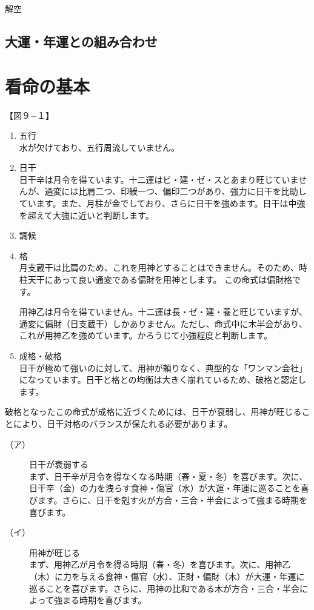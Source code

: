 \documentclass[a5paper,11pt,dvipdfmx]{tarticle}
\begin{document}
解空


\subsection{大運・年運との組み合わせ}



\clearpage




\section{看命の基本}

【図９−１】

\begin{enumerate}
\item 五行\\
水が欠けており、五行周流していません。
\item 日干\\
  日干辛は月令を得ています。十二運はビ・建・ゼ・スとあまり旺じていませんが、通変には比肩二つ、印綬一つ、偏印二つがあり、強力に日干を比助しています。また、月柱が金でしており、さらに日干を強めます。日干は中強を超えて大強に近いと判断します。
  
\item 調候\\

\item 格\\
月支蔵干は比肩のため、これを用神とすることはできません。そのため、時柱天干にあって良い通変である偏財を用神とします。
この命式は偏財格です。

用神乙は月令を得ていません。十二運は長・ゼ・建・養と旺じていますが、通変に偏財（日支蔵干）しかありません。ただし、命式中に木半会があり、これが用神乙を強めています。かろうじて小強程度と判断します。
\item 成格・破格\\
日干が極めて強いのに対して、用神が頼りなく、典型的な「ワンマン会社」になっています。日干と格との均衡は大きく崩れているため、破格と認定します。\\
\end{enumerate}


破格となったこの命式が成格に近づくためには、日干が衰弱し、用神が旺じることにより、日干対格のバランスが保たれる必要があります。
\begin{description}
\item[（ア）] 日干が衰弱する\\
まず、日干辛が月令を得なくなる時期（春・夏・冬）を喜びます。次に、日干辛（金）の力を洩らす食神・傷官（水）が大運・年運に巡ることを喜びます。さらに、日干を剋す火が方合・三合・半会によって強まる時期を喜びます。
\item[（イ）] 用神が旺じる\\
まず、用神乙が月令を得る時期（春・冬）を喜びます。次に、用神乙（木）に力を与える食神・傷官（水）、正財・偏財（木）が大運・年運に巡ることを喜びます。さらに、用神の比和である木が方合・三合・半会によって強まる時期を喜びます。
\end{description}
\end{document}
